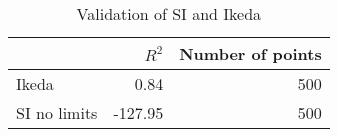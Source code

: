 
\begin{table}[H]
    \centering
    \caption{Validation of SI and Ikeda}
   \begin{tabular}{lrr}
\toprule
{} &   $R^2$ &  Number of points \\
\midrule
Ikeda        &    0.84 &               500 \\
SI no limits & -127.95 &               500 \\
\bottomrule
\end{tabular}

    \label{tab:si_ikeda_validation}
\end{table}
    